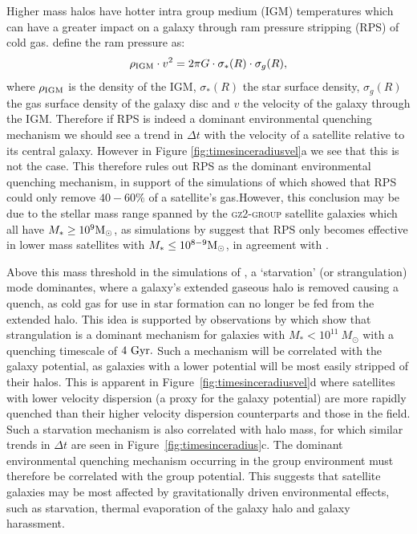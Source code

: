 Higher mass halos have hotter intra group medium (IGM) temperatures \citep{shimizu03, delpopolo05} which can have a greater impact on a galaxy through ram pressure stripping (RPS) of cold gas. \cite{gunngott72} define the ram pressure as:
\begin{equation}\label{eq:rps}
\rho_{\rm{IGM}}\cdot v^2 = 2\pi G \cdot \sigma_*(R) \cdot \sigma_g(R),
\end{equation}
where $\rho_{\rm{IGM}}$ is the density of the IGM, $\sigma_*(R)$ the star surface density, $\sigma_g(R)$ the gas surface density of the galaxy disc and $v$ the velocity of the galaxy through the IGM. Therefore if RPS is indeed a dominant environmental quenching mechanism we should see a trend in $\Delta t$ with the velocity of a satellite relative to its central galaxy.  However in Figure \ref{fig:timesinceradiusvel}a we see that this is not the case. This therefore rules out RPS as the dominant environmental quenching mechanism, in support of the simulations of \citet{emerick16, fillingham16} which showed that RPS could only remove $40-60\%$ of a satellite's gas.However, this conclusion may be due to the stellar mass range spanned by the \textsc{gz2-group} satellite galaxies which all have $M_* \geq 10^9 \rm{M}_{\odot}$, as simulations by \cite{fillingham16} suggest that RPS only becomes effective in lower mass satellites with $M_* \leq 10^{8-9} \rm{M}_{\odot}$, in agreement with \cite{hester06}. 

Above this mass threshold in the simulations of \cite{fillingham16}, a `starvation' (or strangulation) mode \citep{larson80, balogh00} dominantes, where a galaxy's extended gaseous halo is removed causing a quench, as cold gas for use in star formation can no longer be fed from the extended halo. This idea is supported by observations by \citet{peng10} which show that strangulation is a dominant mechanism for galaxies with $M_* < 10^{11}~M_{\odot}$ with a quenching timescale of $4~\rm{Gyr}.$ Such a mechanism will be correlated with the galaxy potential, as galaxies with a lower potential will be most easily stripped of their halos. This is apparent in Figure~\ref{fig:timesinceradiusvel}d where satellites with lower velocity dispersion (a proxy for the galaxy potential) are more rapidly quenched than their higher velocity dispersion counterparts and those in the field. Such a starvation mechanism is also correlated with halo mass, for which similar trends in $\Delta t$ are seen in Figure~\ref{fig:timesinceradius}c. The dominant environmental quenching mechanism occurring in the group environment must therefore be correlated with the group potential. This suggests that satellite galaxies may be most affected by gravitationally driven environmental effects, such as starvation, thermal evaporation of the galaxy halo and galaxy harassment. 


